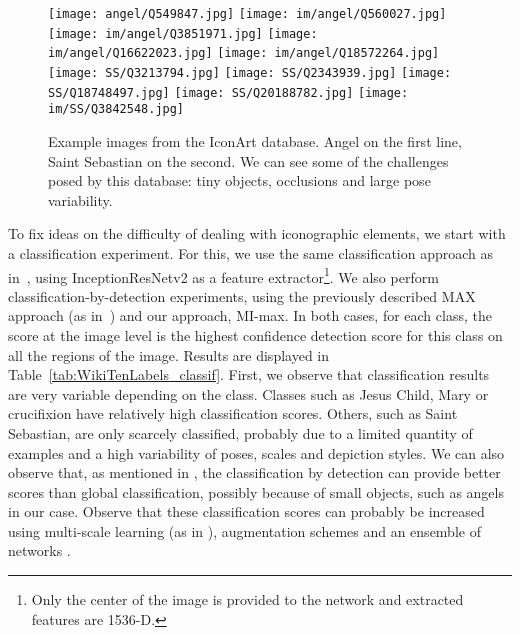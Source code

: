 \documentclass[runningheads]{llncs}
\newcommand\NB{IconArt} \newcommand\MIL{MI-max}
\newcommand\MILS{MI-max}
\newcommand\MAX{MAX}
\newcommand{\heightimage}{2.55cm}
\begin{document}
\begin{figure}
\centering
     \hfill
         \texttt{[image: angel/Q549847.jpg]} \hfill
         \texttt{[image: im/angel/Q560027.jpg]} \hfill
     \texttt{[image: im/angel/Q3851971.jpg]} \hfill
     \texttt{[image: im/angel/Q16622023.jpg]} \hfill
     \texttt{[image: im/angel/Q18572264.jpg]} \hfill \\
     \centering
\hfill
\texttt{[image: SS/Q3213794.jpg]} \hfill \texttt{[image: SS/Q2343939.jpg]} \hfill
     \texttt{[image: SS/Q18748497.jpg]} \hfill
     \texttt{[image: SS/Q20188782.jpg]} \hfill
    \texttt{[image: im/SS/Q3842548.jpg]} \hfill \\
     \centering
\caption{Example images from the \NB{} database. Angel on the first line, Saint Sebastian on the second. We can see some of the challenges posed by this database: tiny objects, occlusions and large pose variability.}
    \label{fig:NotreBase}
\end{figure}

To fix ideas on the difficulty of dealing with iconographic elements, we start with a classification experiment. For this, we use the same classification approach as in~\cite{crowley_search_2014}, using InceptionResNetv2 \cite{szegedy_inceptionv4_2016} as a feature extractor\footnote{Only the center of the image is provided to the network and extracted features are 1536-D.}. We also perform classification-by-detection experiments, using the previously described \MAX{} approach (as in~\cite{crowley_art_2016}) and our approach, \MILS{}. In both cases, for each class, the score at the image level is the highest confidence detection score for this class on all the regions of the image. Results are displayed in Table~\ref{tab:WikiTenLabels_classif}. First, we observe that classification results are very variable depending on the class. Classes such as Jesus Child, Mary or crucifixion have relatively high classification scores. Others, such as Saint Sebastian, are only scarcely classified, probably due to a limited quantity of examples and a high variability of poses, scales and depiction styles. We can also observe that, as mentioned in \cite{crowley_art_2016}, the classification by detection can provide better scores than global classification, possibly because of small objects, such as angels in our case. Observe that these classification scores can probably be increased using multi-scale learning (as in \cite{vannoord_learning_2017}), augmentation schemes and an ensemble of networks \cite{crowley_art_2016}.  
\end{document}
